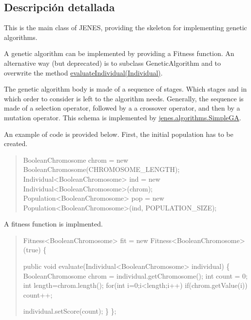 \subsection{Descripción detallada}
This is the main class of J\-E\-N\-E\-S, providing the skeleton for implementing genetic algorithms. 

A genetic algorithm can be implemented by providing a {\ttfamily Fitness} function. An alternative way (but deprecated) is to subclass {\ttfamily Genetic\-Algorithm} and to overwrite the method \hyperlink{}{evaluate\-Individual(\-Individual)}. 

The genetic algorithm body is made of a sequence of stages. Which stages and in which order to consider is left to the algorithm needs. Generally, the sequence is made of a selection operator, followed by a a crossover operator, and then by a mutation operator. This schema is implemented by \hyperlink{}{jenes.\-algorithms.\-Simple\-G\-A}. 

An example of code is provided below. First, the initial population has to be created. 

\begin{quotation}



\begin{DoxyPre}
BooleanChromosome chrom = new BooleanChromosome(CHROMOSOME\_LENGTH);
Individual<BooleanChromosome> ind = new Individual<BooleanChromosome>(chrom);
Population<BooleanChromosome> pop = new Population<BooleanChromosome>(ind,
        POPULATION\_SIZE);
\end{DoxyPre}


\end{quotation}


A fitness function is implmented.

\begin{quotation}

\begin{DoxyPre}
Fitness<BooleanChromosome> fit = new Fitness<BooleanChromosome>(true) \{\end{DoxyPre}



\begin{DoxyPre}    
    public void evaluate(Individual<BooleanChromosome> individual) \{
        BooleanChromosome chrom = individual.getChromosome();
        int count = 0;
        int length=chrom.length();
        for(int i=0;i<length;i++)
            if(chrom.getValue(i))
                count++;\end{DoxyPre}



\begin{DoxyPre}            individual.setScore(count);
         \}           
    \};
\end{DoxyPre}
 \end{quotation}


